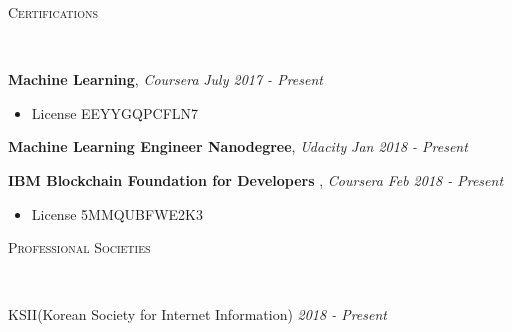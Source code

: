 \documentclass[10pt]{article}
\newenvironment{changemargin}[2]{
  \begin{list}{}{
    \setlength{\topsep}{0pt}
    \setlength{\leftmargin}{#1}
    \setlength{\rightmargin}{#2}
    \setlength{\listparindent}{\parindent}
    \setlength{\itemindent}{\parindent}
    \setlength{\parsep}{\parskip}
  }
  \item[]}{\end{list}
}
\newcommand{\lineover}{
	\begin{changemargin}{-0.05in}{-0.05in}
		\vspace*{-8pt}
		\hrulefill \\
		\vspace*{-2pt}
	\end{changemargin}
}
\newcommand{\header}[1]{
	\begin{changemargin}{-0.5in}{-0.5in}
		\scshape{#1}\\
  	\lineover
	\end{changemargin}
}
\newcommand{\labdescription}[1]{
	\begin{changemargin}{0.15in}{0.15in}
    \smallskip
		{#1}
    \medskip
	\end{changemargin}
}
\newcommand{\labtitle}[3]{
	\textbf{#1}, \emph{#2} \hfill \emph{#3}\\
}
\newcommand{\society}[2]{
	{#1} \hfill \emph{#2}\\ \medskip
}
\newenvironment{body} {
	\vspace*{-16pt}
	\begin{changemargin}{-0.25in}{-0.5in}
  }
	{\end{changemargin}
}
\begin{document}
\medskip


\header{Certifications}

\begin{body}
	\vspace{14pt}

  	\labtitle{Machine Learning}{Coursera}{July 2017 - Present}
  \labdescription {
  	\begin{itemize} \itemsep -0pt  %
      \item License EEYYGQPCFLN7
  	\end{itemize}
  }
  
  	\labtitle{Machine Learning Engineer Nanodegree}{Udacity}{Jan 2018 - Present}
  \labdescription {
  	\begin{itemize} \itemsep -0pt  %
  	\end{itemize}
  }
  
  	\labtitle{IBM Blockchain Foundation for Developers }{Coursera}{Feb 2018 - Present}
  \labdescription {
  	\begin{itemize} \itemsep -0pt  %
      \item License 5MMQUBFWE2K3
  	\end{itemize}
  }

\end{body}

\medskip


\header{Professional Societies}

\begin{body}
	\vspace{14pt}

\society{KSII(Korean Society for Internet Information)}{2018 - Present}

\end{body}
\end{document}
